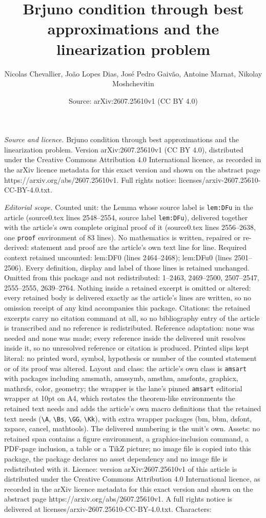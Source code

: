 \documentclass[10pt,a4paper]{amsart}
\title[Brjuno condition through best approximations and the lineari]{Brjuno condition through best approximations and the linearization problem}
\author{Nicolas Chevallier, Jo\~{a}o Lopes Dias, Jos\'e Pedro Gaiv\~ao, Antoine Marnat, Nikolay Moshchevitin}
\date{Source: arXiv:2607.25610v1 (CC BY 4.0)}
\begin{document}
\maketitle

\noindent\emph{Source and licence.} Brjuno condition through best approximations and the linearization problem. Version arXiv:2607.25610v1 (CC BY 4.0), distributed under the Creative Commons Attribution 4.0 International licence, as recorded in the arXiv licence metadata for this exact version and shown on the abstract page https://arxiv.org/abs/2607.25610v1. Full rights notice: licenses/arxiv-2607.25610-CC-BY-4.0.txt.\par\smallskip

\noindent\textit{Editorial scope.} Counted unit: the Lemma whose source label is \texttt{lem:DFu} in the article (source0.tex lines 2548--2554, source label \texttt{lem:DFu}), delivered together with the article's own complete original proof of it (source0.tex lines 2556--2638, one \texttt{proof} environment of 83 lines). No mathematics is written, repaired or re-derived: statement and proof are the article's own text line for line. Required context retained uncounted: lem:DF0 (lines 2464--2468); lem:DFu0 (lines 2501--2506). Every definition, display and label of those lines is retained unchanged. Omitted from this package and not redistributed: 1--2463, 2469--2500, 2507--2547, 2555--2555, 2639--2764. Nothing inside a retained excerpt is omitted or altered: every retained body is delivered exactly as the article's lines are written, so no omission receipt of any kind accompanies this package. Citations: the retained excerpts carry no citation command at all, so no bibliography entry of the article is transcribed and no reference is redistributed. Reference adaptation: none was needed and none was made; every reference inside the delivered unit resolves inside it, so no unresolved reference or citation is produced. Printed slips kept literal: no printed word, symbol, hypothesis or number of the counted statement or of its proof was altered. Layout and class: the article's own class is \texttt{amsart} with packages including amsmath, amssymb, amsthm, amsfonts, graphicx, mathrsfs, color, geometry; the wrapper is the lane's pinned \texttt{amsart} editorial wrapper at 10pt on A4, which restates the theorem-like environments the retained text needs and adds the article's own macro definitions that the retained text needs (\texttt{\textbackslash A}, \texttt{\textbackslash Bs}, \texttt{\textbackslash GG}, \texttt{\textbackslash Kk}), with extra wrapper packages (bm, bbm, dsfont, xspace, cancel, mathtools). The delivered numbering is the unit's own. Assets: no retained span contains a figure environment, a graphics-inclusion command, a PDF-page inclusion, a table or a TikZ picture; no image file is copied into this package, the package declares no asset dependency and no image file is redistributed with it. Licence: version arXiv:2607.25610v1 of this article is distributed under the Creative Commons Attribution 4.0 International licence, as recorded in the arXiv licence metadata for this exact version and shown on the abstract page https://arxiv.org/abs/2607.25610v1. A full rights notice is delivered at licenses/arxiv-2607.25610-CC-BY-4.0.txt. Characters: 
\end{document}
